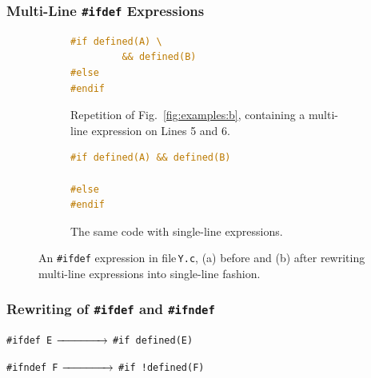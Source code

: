\documentclass{beamer}
\newcommand\code[1]{\texttt{#1}}
\newcommand\ifdeff[1]{\code{\##1}\xspace}
\newcommand\ifdef[0]{{\upshape\ifdeff{ifdef}}\xspace}
\begin{document}
\begin{frame}[fragile]
\frametitle{Multi-Line \ifdef Expressions}


\begin{figure}[ht]
  \centering
  \begin{subfigure}[b]{0.45\textwidth}
		\begin{lstlisting}[language=C, firstnumber=5]
#if defined(A) \
		 && defined(B)
#else 
#endif
		\end{lstlisting}
		\caption{Repetition of Fig.\ \ref{fig:examples:b}, containing a multi-line expression on Lines 5 and 6.}
		\label{fig:multiline:a}
  \end{subfigure}
  \hfill
  \begin{subfigure}[b]{0.45\textwidth}
		\begin{lstlisting}[language=C, firstnumber=5]
#if defined(A) && defined(B)

#else 
#endif
		\end{lstlisting}
		\caption{The same code with single-line expressions.\vspace{1.15em}}
		\label{fig:multiline:b}
  \end{subfigure}
  
  \caption{An \ifdef expression in file\,\code{Y.c}, (a) before and (b) after rewriting multi-line expressions into single-line fashion.}
  
\end{figure}

\end{frame}


\begin{frame}[fragile]
\frametitle{Rewriting of \ifdeff{ifdef} and \ifdeff{ifndef}}

\vfill
\ifdeff{ifdef E} \hfill $\xrightarrow{\hspace*{4em}}$ \hfill \ifdeff{if defined(E)}

\vfill

\ifdeff{ifndef F} \hfill $\xrightarrow{\hspace*{4em}}$ \hfill \ifdeff{if !defined(F)}

\vfill

\end{frame}
\end{document}
